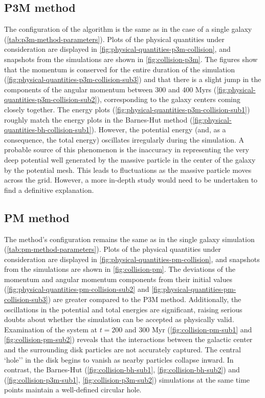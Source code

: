 \subsection{P3M method}
The configuration of the algorithm is the same as in the case of a single galaxy (\autoref{tab:p3m-method-parameters}).
Plots of the physical quantities under consideration are displayed in \autoref{fig:physical-quantities-p3m-collision}, and snapshots from the simulations are shown in \autoref{fig:collision-p3m}.
The figures show that the momentum is conserved for the entire duration of the simulation (\autoref{fig:physical-quantities-p3m-collision-sub3}) and that there is a slight jump in the components of the angular momentum between 300 and 400 Myrs (\autoref{fig:physical-quantities-p3m-collision-sub2}), corresponding to the galaxy centers coming closely together.
The energy plots (\autoref{fig:physical-quantities-p3m-collision-sub1}) roughly match the energy plots in the Barnes-Hut method (\autoref{fig:physical-quantities-bh-collision-sub1}).
However, the potential energy (and, as a consequence, the total energy) oscillates irregularly during the simulation.
A probable source of this phenomenon is the inaccuracy in representing the very deep potential well generated by the massive particle in the center of the galaxy by the potential mesh.
This leads to fluctuations as the massive particle moves across the grid.
However, a more in-depth study would need to be undertaken to find a definitive explanation.

\subsection{PM method}
The method's configuration remains the same as in the single galaxy simulation (\autoref{tab:pm-method-parameters}).
Plots of the physical quantities under consideration are displayed in \autoref{fig:physical-quantities-pm-collision}, and snapshots from the simulations are shown in \autoref{fig:collision-pm}.
The deviations of the momentum and angular momentum components from their initial values (\autoref{fig:physical-quantities-pm-collision-sub2} and \autoref{fig:physical-quantities-pm-collision-sub3}) are greater compared to the P3M method.
Additionally, the oscillations in the potential and total energies are significant, raising serious doubts about whether the simulation can be accepted as physically valid.
Examination of the system at $t = 200$ and $300$ Myr (\autoref{fig:collision-pm-sub1} and \autoref{fig:collision-pm-sub2}) reveals that the interactions between the galactic center and the surrounding disk particles are not accurately captured.
The central `hole'' in the disk begins to vanish as nearby particles collapse inward.
In contrast, the Barnes-Hut (\autoref{fig:collision-bh-sub1}, \autoref{fig:collision-bh-sub2}) and \PThreeM{} (\autoref{fig:collision-p3m-sub1}, \autoref{fig:collision-p3m-sub2}) simulations at the same time points maintain a well-defined circular hole.